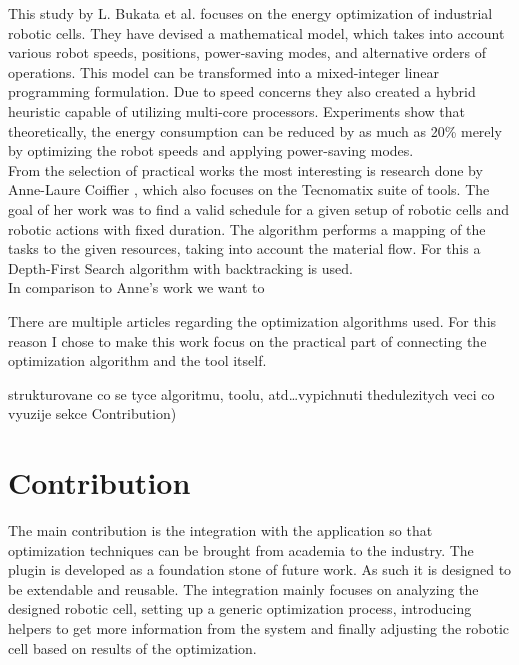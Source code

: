 This study by L. Bukata et al. \cite{EnergyOptimisationBukata} focuses on the energy optimization of industrial robotic cells. They have devised a mathematical model, which takes into account various robot speeds, positions, power-saving modes, and alternative orders of operations. This model can be transformed into a mixed-integer linear programming formulation. Due to speed concerns they also created a hybrid heuristic capable of utilizing multi-core processors. Experiments show that theoretically, the energy consumption can be reduced by as much as 20\% merely by optimizing the robot speeds and applying power-saving modes. \\

From the selection of practical works the most interesting is research done by Anne-Laure Coiffier \cite{AnneBacktracking}, which also focuses on the Tecnomatix suite of tools. The goal of her work was to find a valid schedule for a given setup of robotic cells and robotic actions with fixed duration. The algorithm performs a mapping of the tasks to the given resources, taking into account the material flow. For this a Depth-First Search algorithm with backtracking is used. \\

In comparison to Anne's work we want to 

There are multiple articles regarding the optimization algorithms used. For this reason I chose to make this work focus on the practical part of connecting the optimization algorithm and the tool itself.


strukturovane co se tyce algoritmu, toolu, atd\ldots vypichnuti thedulezitych veci co vyuzije sekce Contribution)

\section{Contribution}

The main contribution is the integration with the application so that optimization techniques can be brought from academia to the industry. The plugin is developed as a foundation stone of future work. As such it is designed to be extendable and reusable. The integration mainly focuses on analyzing the designed robotic cell, setting up a generic optimization process, introducing helpers to get more information from the system and finally adjusting the robotic cell based on results of the optimization. \\

